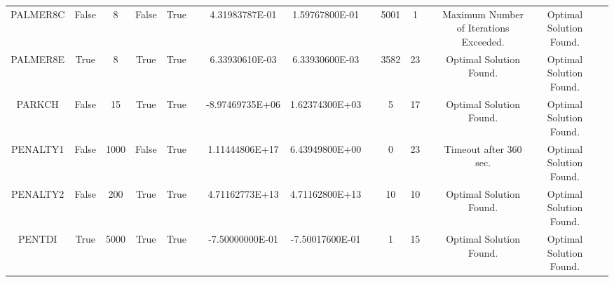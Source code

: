 \begin{longtable}{ccccccccccccccc}
	\cellcolor{default2} PALMER8C& \cellcolor{default2} False& \cellcolor{default2} 8& \cellcolor{default2} False& \cellcolor{default2} True& \cellcolor{header} & \cellcolor{poor} 4.31983787E-01& \cellcolor{best} 1.59767800E-01& \cellcolor{header} & \cellcolor{poor} 5001& \cellcolor{best} 1& \cellcolor{header} & \cellcolor{default2} Maximum Number of Iterations Exceeded.& \cellcolor{default2} Optimal Solution Found.& \cellcolor{header} \\
	\cellcolor{default1} PALMER8E& \cellcolor{default1} True& \cellcolor{default1} 8& \cellcolor{default1} True& \cellcolor{default1} True& \cellcolor{header} & \cellcolor{ok} 6.33930610E-03& \cellcolor{best} 6.33930600E-03& \cellcolor{header} & \cellcolor{poor} 3582& \cellcolor{best} 23& \cellcolor{header} & \cellcolor{default1} Optimal Solution Found.& \cellcolor{default1} Optimal Solution Found.& \cellcolor{header} \\
	\cellcolor{default2} PARKCH& \cellcolor{default2} False& \cellcolor{default2} 15& \cellcolor{default2} True& \cellcolor{default2} True& \cellcolor{header} & \cellcolor{best} -8.97469735E+06& \cellcolor{poor} 1.62374300E+03& \cellcolor{header} & \cellcolor{best} 5& \cellcolor{poor} 17& \cellcolor{header} & \cellcolor{default2} Optimal Solution Found.& \cellcolor{default2} Optimal Solution Found.& \cellcolor{header} \\
	\cellcolor{default1} PENALTY1& \cellcolor{default1} False& \cellcolor{default1} 1000& \cellcolor{default1} False& \cellcolor{default1} True& \cellcolor{header} & \cellcolor{poor} 1.11444806E+17& \cellcolor{best} 6.43949800E+00& \cellcolor{header} & \cellcolor{best} 0& \cellcolor{poor} 23& \cellcolor{header} & \cellcolor{default1} Timeout after 360 sec.& \cellcolor{default1} Optimal Solution Found.& \cellcolor{header} \\
	\cellcolor{default2} PENALTY2& \cellcolor{default2} False& \cellcolor{default2} 200& \cellcolor{default2} True& \cellcolor{default2} True& \cellcolor{header} & \cellcolor{best} 4.71162773E+13& \cellcolor{ok} 4.71162800E+13& \cellcolor{header} & \cellcolor{best} 10& \cellcolor{best} 10& \cellcolor{header} & \cellcolor{default2} Optimal Solution Found.& \cellcolor{default2} Optimal Solution Found.& \cellcolor{header} \\
	\cellcolor{default1} PENTDI& \cellcolor{default1} True& \cellcolor{default1} 5000& \cellcolor{default1} True& \cellcolor{default1} True& \cellcolor{header} & \cellcolor{ok} -7.50000000E-01& \cellcolor{best} -7.50017600E-01& \cellcolor{header} & \cellcolor{best} 1& \cellcolor{poor} 15& \cellcolor{header} & \cellcolor{default1} Optimal Solution Found.& \cellcolor{default1} Optimal Solution Found.& \cellcolor{header} \\

\end{longtable}
